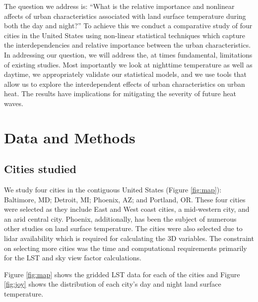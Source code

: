 \documentclass[final,3p,times,twocolumn,sort&compress]{elsarticle}
\begin{document}
The question we address is: ``What is the relative importance and nonlinear affects of urban characteristics associated with land surface temperature during both the day and night?''
To achieve this we conduct a comparative study of four cities in the United States using non-linear statistical techniques which capture the interdependencies and relative importance between the urban characteristics.
In addressing our question, we will address the, at times fundamental, limitations of existing studies.
Most importantly we look at nighttime temperature as well as daytime, we appropriately validate our statistical models, and we use tools that allow us to explore the interdependent effects of urban characteristics on urban heat.
The results have implications for mitigating the severity of future heat waves.

\section{Data and Methods}
\subsection{Cities studied}

We study four cities in the contiguous United States (Figure \ref{fig:map}): Baltimore, MD; Detroit, MI; Phoenix, AZ; and Portland, OR. These four cities were selected as they include East and West coast cities, a mid-western city, and an arid central city. Phoenix, additionally, has been the subject of numerous other studies on land surface temperature. The cities were also selected due to lidar availability which is required for calculating the 3D variables. The constraint on selecting more cities was the time and computational requirements primarily for the LST and sky view factor calculations. 

Figure \ref{fig:map} shows the gridded LST data for each of the cities and Figure \ref{fig:joy} shows the distribution of each city's day and night land surface temperature. 
\end{document}
